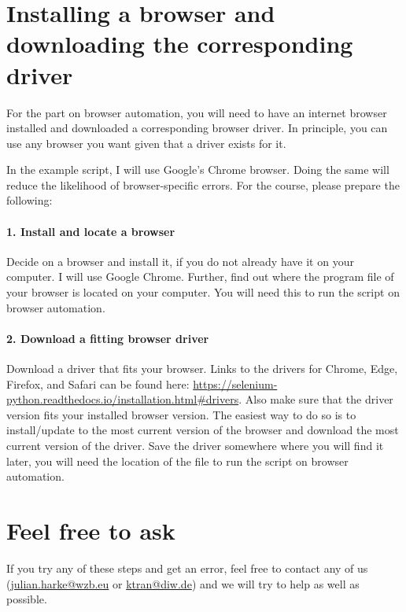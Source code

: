 \documentclass[a4paper]{article}
\begin{document}
\section{Installing a browser and downloading the corresponding driver}

For the part on browser automation, you will need to have an internet browser installed and downloaded a corresponding browser driver. In principle, you can use any browser you want given that a driver exists for it.

In the example script, I will use Google's Chrome browser. Doing the same will reduce the likelihood of browser-specific errors. For the course, please prepare the following:

\paragraph{1. Install and locate a browser} Decide on a browser and install it, if you do not already have it on your computer. I will use Google Chrome. Further, find out where the program file of your browser is located on your computer. You will need this to run the script on browser automation.

\paragraph{2. Download a fitting browser driver} Download a driver that fits your browser. Links to the drivers for Chrome, Edge, Firefox, and Safari can be found here: \url{https://selenium-python.readthedocs.io/installation.html#drivers}. Also make sure that the driver version fits your installed browser version. The easiest way to do so is to install/update to the most current version of the browser and download the most current version of the driver. Save the driver somewhere where you will find it later, you will need the location of the file to run the script on browser automation.

\section{Feel free to ask}

If you try any of these steps and get an error, feel free to contact any of us (\href{mailto:julian.harke@wzb.eu}{julian.harke@wzb.eu} or \href{mailto:ktran@diw.de}{ktran@diw.de}) and we will try to help as well as possible.
\end{document}
